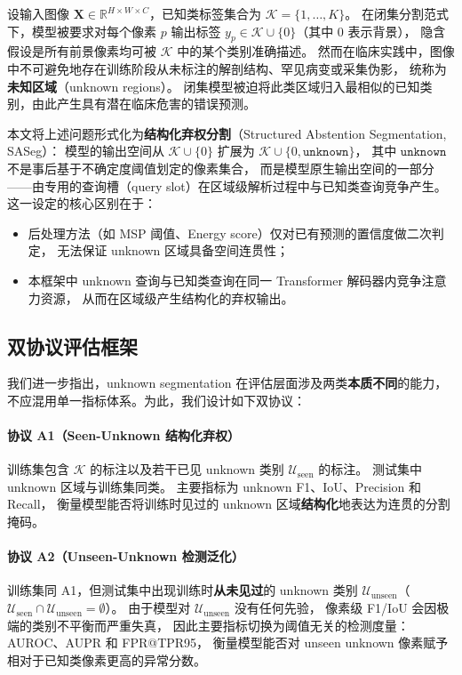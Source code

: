 \documentclass[3p,twocolumn,authoryear]{elsarticle}
\newcommand{\R}{\mathbb{R}}                              %
\newcommand{\cK}{\mathcal{K}}                             %
\newcommand{\cU}{\mathcal{U}}                             %
\begin{document}
设输入图像 $\mathbf{X} \in \R^{H \times W \times C}$，已知类标签集合为 $\cK = \{1, \ldots, K\}$。
在闭集分割范式下，模型被要求对每个像素 $p$ 输出标签 $y_p \in \cK \cup \{0\}$（其中 $0$ 表示背景），
隐含假设是所有前景像素均可被 $\cK$ 中的某个类别准确描述。
然而在临床实践中，图像中不可避免地存在训练阶段从未标注的解剖结构、罕见病变或采集伪影，
统称为\textbf{未知区域}（unknown regions）。
闭集模型被迫将此类区域归入最相似的已知类别，由此产生具有潜在临床危害的错误预测。

本文将上述问题形式化为\textbf{结构化弃权分割}（Structured Abstention Segmentation, SASeg）：
模型的输出空间从 $\cK \cup \{0\}$ 扩展为 $\cK \cup \{0, \texttt{unknown}\}$，
其中 $\texttt{unknown}$ 不是事后基于不确定度阈值划定的像素集合，
而是模型原生输出空间的一部分——由专用的查询槽（query slot）在区域级解析过程中与已知类查询竞争产生。
这一设定的核心区别在于：
\begin{itemize}[nosep]
  \item 后处理方法（如 MSP 阈值、Energy score）仅对已有预测的置信度做二次判定，
        无法保证 unknown 区域具备空间连贯性；
  \item 本框架中 unknown 查询与已知类查询在同一 Transformer 解码器内竞争注意力资源，
        从而在区域级产生结构化的弃权输出。
\end{itemize}

\subsection{双协议评估框架}\label{sec:problem:protocol}

我们进一步指出，unknown segmentation 在评估层面涉及两类\textbf{本质不同}的能力，
不应混用单一指标体系。为此，我们设计如下双协议：

\paragraph{协议 A1（Seen-Unknown 结构化弃权）}
训练集包含 $\cK$ 的标注以及若干已见 unknown 类别 $\cU_{\text{seen}}$ 的标注。
测试集中 unknown 区域与训练集同类。
主要指标为 unknown F1、IoU、Precision 和 Recall，
衡量模型能否将训练时见过的 unknown 区域\textbf{结构化}地表达为连贯的分割掩码。

\paragraph{协议 A2（Unseen-Unknown 检测泛化）}
训练集同 A1，但测试集中出现训练时\textbf{从未见过}的 unknown 类别 $\cU_{\text{unseen}}$（$\cU_{\text{seen}} \cap \cU_{\text{unseen}} = \emptyset$）。
由于模型对 $\cU_{\text{unseen}}$ 没有任何先验，
像素级 F1/IoU 会因极端的类别不平衡而严重失真，
因此主要指标切换为阈值无关的检测度量：AUROC、AUPR 和 FPR@TPR95，
衡量模型能否对 unseen unknown 像素赋予相对于已知类像素更高的异常分数。
\end{document}
